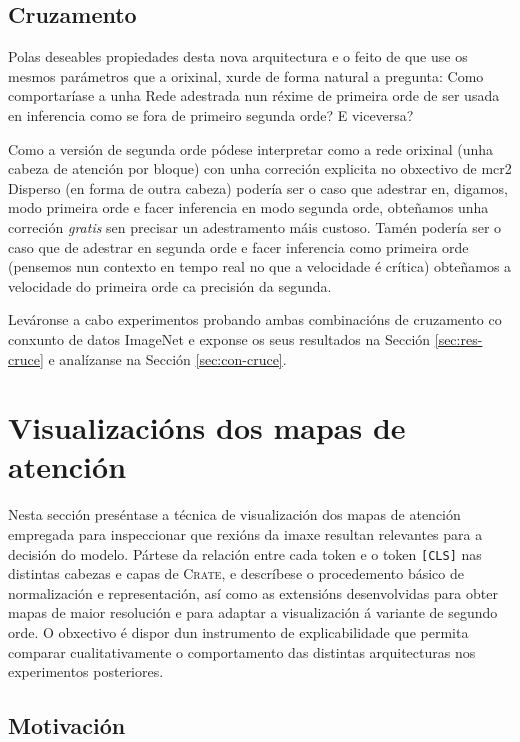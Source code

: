 \subsection{Cruzamento}
\label{sec:cruce}

Polas deseables propiedades desta nova arquitectura e o feito de que use os mesmos parámetros que a orixinal, xurde de forma natural a pregunta: Como comportaríase a unha Rede adestrada nun réxime de primeira orde de ser usada en inferencia como se fora de primeiro segunda orde? E viceversa?

Como a versión de segunda orde pódese interpretar como a rede orixinal (unha cabeza de atención por bloque) con unha correción explicita no obxectivo de \acrshort{mcr2} Disperso  (en forma de outra cabeza) podería ser o caso que adestrar en, digamos, modo primeira orde e facer inferencia en modo segunda orde, obteñamos unha correción \emph{gratis} sen precisar un adestramento máis custoso. Tamén podería ser o caso que de adestrar en segunda orde e facer inferencia como primeira orde (pensemos nun contexto en tempo real no que a velocidade é crítica) obteñamos a velocidade do primeira orde ca precisión da segunda.

Leváronse a cabo experimentos probando ambas combinacións de cruzamento co conxunto de datos ImageNet e exponse os seus resultados na Sección \ref{sec:res-cruce} e analízanse na Sección \ref{sec:con-cruce}.


\section{Visualizacións dos mapas de atención}
\label{sec:trab-vis}

Nesta sección preséntase a técnica de visualización dos mapas de atención empregada para inspeccionar que rexións da imaxe resultan relevantes para a decisión do modelo. Pártese da relación entre cada token e o token \texttt{[CLS]} nas distintas cabezas e capas de \textsc{Crate}, e descríbese o procedemento básico de normalización e representación, así como as extensións desenvolvidas para obter mapas de maior resolución e para adaptar a visualización á variante de segundo orde. O obxectivo é dispor dun instrumento de explicabilidade que permita comparar cualitativamente o comportamento das distintas arquitecturas nos experimentos posteriores.

\subsection{Motivación}

